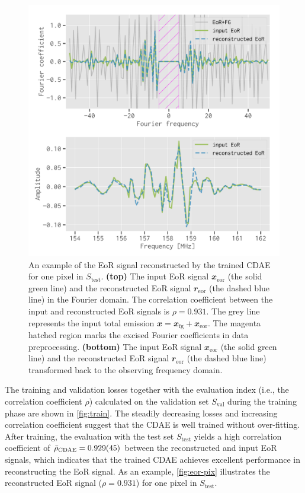 \documentclass[fleqn,usenatbib]{mnras}
\newcommand{\R}[1]{\mathrm{#1}}
\newcommand{\B}[1]{\mathbfit{#1}}
\newcommand{\editone}[1]{{\leavevmode\color{cyan}#1}}
\begin{document}
\begin{figure}
  \centering
  \includegraphics[width=\columnwidth]{eor-result}
  \caption{\label{fig:eor-pix}%
    An example of the EoR signal reconstructed by the trained CDAE for
    one pixel \editone{in $S_{\R{test}}$}.
    \textbf{(top)} The input EoR signal $\B{x}_{\R{eor}}$ (the solid
    green line) and the reconstructed EoR signal $\B{r}_{\R{eor}}$
    (the dashed blue line) in the Fourier domain.
    \editone{The correlation coefficient between the input and
      reconstructed EoR signals is $\rho = 0.931$.}
    The grey line represents the input total emission
    $\B{x} = \B{x}_{\R{fg}} + \B{x}_{\R{eor}}$.
    The magenta hatched region marks the excised Fourier coefficients
    in data preprocessing.
    \textbf{(bottom)} The input EoR signal $\B{x}_{\R{eor}}$ (the solid
    green line) and the reconstructed EoR signal $\B{r}_{\R{eor}}$
    (the dashed blue line) transformed back to the observing frequency
    domain.
  }
\end{figure}

The training and validation losses together with the evaluation index
(i.e., the correlation coefficient $\rho$) calculated on the validation set
$S_{\R{val}}$ during the training phase are shown in \autoref{fig:train}.
The steadily decreasing losses and increasing correlation coefficient
suggest that the CDAE is well trained without over-fitting.
\editone{%
After training, the evaluation with the test set $S_{\R{test}}$ yields a
high correlation coefficient of $\bar{\rho}_{\R{CDAE}} = \num{0.929 +- 0.045}$
between the reconstructed and input EoR signals, which indicates that the
trained CDAE achieves excellent performance in reconstructing the EoR
signal.} %
As an example, \autoref{fig:eor-pix} illustrates the reconstructed EoR
signal (\editone{$\rho = 0.931$}) for one pixel \editone{in $S_{\R{test}}$}.
\end{document}
